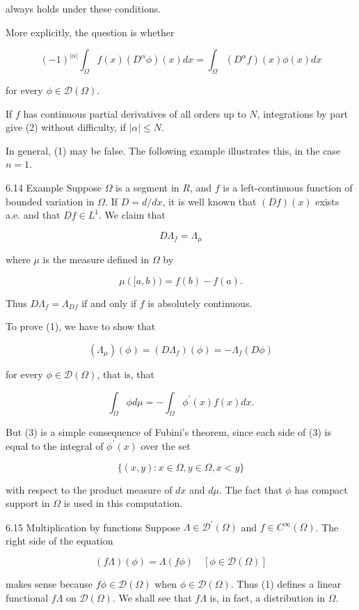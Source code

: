 \documentclass[10pt]{article}
\begin{document}
always holds under these conditions.

More explicitly, the question is whether

$$
(-1)^{|\alpha|} \int_{\Omega} f(x)\left(D^{\alpha} \phi\right)(x) d x=\int_{\Omega}\left(D^{\alpha} f\right)(x) \phi(x) d x
$$

for every $\phi \in \mathscr{D}(\Omega)$.

If $f$ has continuous partial derivatives of all orders up to $N$, integrations by part give (2) without difficulty, if $|\alpha| \leq N$.

In general, (1) may be false. The following example illustrates this, in the case $n=1$.

6.14 Example Suppose $\Omega$ is a segment in $R$, and $f$ is a left-continuous function of bounded variation in $\Omega$. If $D=d / d x$, it is well known that $(D f)(x)$ exists a.e. and that $D f \in L^{1}$. We claim that

$$
D \Lambda_{f}=\Lambda_{\mu}
$$

where $\mu$ is the measure defined in $\Omega$ by

$$
\mu([a, b))=f(b)-f(a) .
$$

Thus $D \Lambda_{f}=\Lambda_{D f}$ if and only if $f$ is absolutely continuous.

To prove (1), we have to show that

$$
\left(\Lambda_{\mu}\right)(\phi)=\left(D \Lambda_{f}\right)(\phi)=-\Lambda_{f}(D \phi)
$$

for every $\phi \in \mathscr{D}(\Omega)$, that is, that

$$
\int_{\Omega} \phi d \mu=-\int_{\Omega} \phi^{\prime}(x) f(x) d x .
$$

But (3) is a simple consequence of Fubini's theorem, since each side of (3) is equal to the integral of $\phi^{\prime}(x)$ over the set

$$
\{(x, y): x \in \Omega, y \in \Omega, x<y\}
$$

with respect to the product measure of $d x$ and $d \mu$. The fact that $\phi$ has compact support in $\Omega$ is used in this computation.

6.15 Multiplication by functions Suppose $\Lambda \in \mathscr{D}^{\prime}(\Omega)$ and $f \in C^{\infty}(\Omega)$. The right side of the equation

$$
(f \Lambda)(\phi)=\Lambda(f \phi) \quad[\phi \in \mathscr{D}(\Omega)]
$$

makes sense because $f \phi \in \mathscr{D}(\Omega)$ when $\phi \in \mathscr{D}(\Omega)$. Thus (1) defines a linear functional $f \Lambda$ on $\mathscr{D}(\Omega)$. We shall see that $f \Lambda$ is, in fact, a distribution in $\Omega$.
\end{document}
